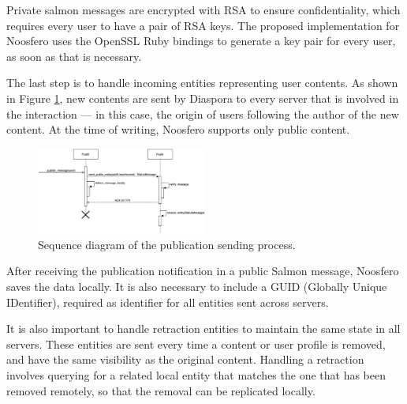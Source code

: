 Private salmon messages are encrypted with RSA to ensure
confidentiality, which requires every user to have a pair of RSA keys.
The proposed implementation for Noosfero uses the OpenSSL Ruby bindings
to generate a key pair for every user, as soon as that is necessary.

The last step is to handle incoming entities representing user contents.
As shown in Figure \ref{fig:seq_publication}, new contents are sent by
Diaspora to every server that is involved in the interaction --- in this
case, the origin of users following the author of the new content. At
the time of writing, Noosfero supports only public content.

\begin{figure}[h]
	\centering
		\includegraphics[width=0.5\textwidth]{figures/seq_publicacao.eps}
	\caption{Sequence diagram of the publication sending process.}
	\label{fig:seq_publication}
\end{figure}

After receiving the publication notification in a public Salmon message,
Noosfero  saves the data locally. It is also necessary to include a GUID
(Globally Unique IDentifier), required as identifier for all entities sent
across servers.

It is also important to handle retraction entities to maintain the same state
in all servers. These entities are sent every time a content or user profile is
removed, and have the same visibility as the original content.  Handling a
retraction involves querying for a related local entity that matches the one
that has been removed remotely, so that the removal can be replicated locally.
